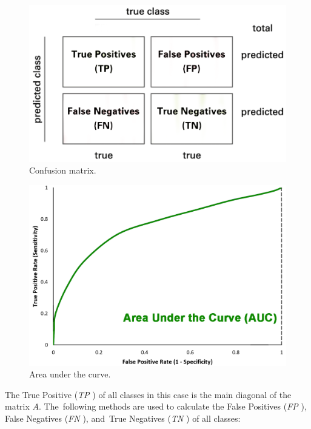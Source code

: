 \documentclass[sensors,article,accept,pdftex,moreauthors]{Definitions/mdpi}
\begin{document}
\vspace{-12pt}
		\begin{figure}[H]
\includegraphics[width=0.7\linewidth]{Definitions/Confusion-matrix}
\caption{Confusion matrix.}\label{fig:confusion-matrix}
		\end{figure}\unskip
\begin{figure}[H]
\includegraphics[width=.7\linewidth]{Definitions/AUC}
\caption{{Area} %
 under the curve.}\label{fig:AUC}
	\end{figure}
	
	The True Positive ({\textit{TP}}%
) of all classes in this case is the main diagonal of the matrix $A$. The~following methods are used to calculate the False Positives ({\textit{FP}}%
), False Negatives ({\textit{FN}}%
), and~True Negatives ({\textit{TN}}%
) of all classes:
	
\end{document}
